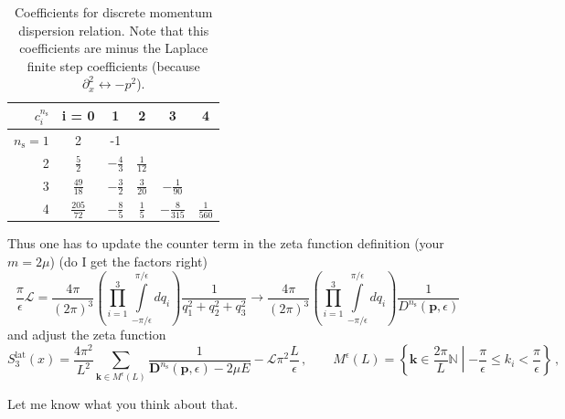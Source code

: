 \documentclass[
    aps,
    prl,
    showkeys,
    nofootinbib,
    floatfix
]{revtex4-1}
\renewcommand{\vec}[1]{\boldsymbol{#1}}
\begin{document}
\begin{table}[htb]
\centering
\begin{tabular}{r | ccccc}
$ c_{i}^{n_{\mathrm{s}}}$ & i = 0 & 1 & 2 & 3 & 4 \\ \hline
$n_{\mathrm{s}} = 1$ & 2 & -1 \\
2 & $\frac{5}{2}$ & $-\frac{4}{3}$ & $\frac{1}{12}$ \\
3 & $\frac{49}{18}$ & $-\frac{3}{2}$ & $\frac{3}{20}$ & $-\frac{1}{90}$ \\
4 & $\frac{205}{72}$ & $-\frac{8}{5}$ & $\frac{1}{5}$  & $-\frac{8}{315}$ & $\frac{1}{560}$
\end{tabular}
\caption{\label{tab-dispersion-coeff}Coefficients for discrete momentum dispersion relation.
    Note that this coefficients are minus the Laplace finite step coefficients (because $\partial_x^2 \leftrightarrow - p^2$).
}
\end{table}

Thus one has to update the counter term in the zeta function definition (your $m = 2\mu$) (do I get the factors right)
\begin{equation}
    \frac{\pi}{\epsilon}
    \mathcal L
    =
    \frac{4 \pi}{(2\pi)^3}
    \left(
    \prod \limits_{i=1}^3
    \int\limits_{-\pi /\epsilon}^{\pi / \epsilon}
    d q_i
    \right)
    \frac{1}{q_1^2 + q_2^2 + q_3^2}
    \to
    \frac{4 \pi}{(2\pi)^3}
    \left(
    \prod \limits_{i=1}^3
    \int\limits_{-\pi / \epsilon}^{\pi / \epsilon}
    d q_i
    \right)
    \frac{1}{D^{n_{\mathrm{s}}}(\vec p, \epsilon)}
\end{equation}
and adjust the zeta function
\begin{equation}
    S_3^{\mathrm{lat}}(x) = \frac{4 \pi^2}{L^2} \sum\limits_{\vec k \in M^\epsilon(L)} \frac{1}{\vec D^{n_{\mathrm{s}}}(\vec p, \epsilon) - 2 \mu E} - \mathcal L \pi^2 \frac{L}{\epsilon}
    \, , \qquad
    M^\epsilon(L) = \left\{ \vec k \in \frac{2 \pi}{L} \mathbb N \middle\vert - \frac{\pi}{\epsilon} \leq k_i < \frac{\pi}{\epsilon} \right\}
    \, ,
\end{equation}

Let me know what you think about that.

\newpage
\end{document}
